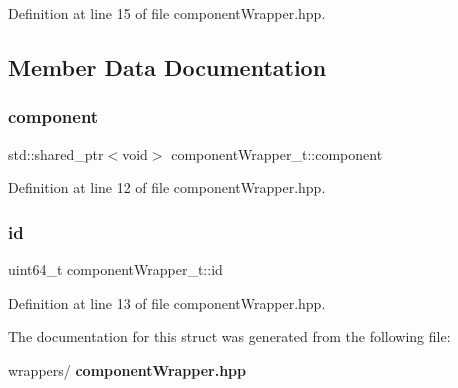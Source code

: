 Definition at line 15 of file component\+Wrapper.\+hpp.



\subsection{Member Data Documentation}
\mbox{\label{structcomponent_wrapper__t_a2ba0f6c96cc8e26401df3fecb346bf3f}} 
\subsubsection{component}
{\footnotesize\ttfamily std\+::shared\+\_\+ptr$<$void$>$ component\+Wrapper\+\_\+t\+::component}



Definition at line 12 of file component\+Wrapper.\+hpp.

\mbox{\label{structcomponent_wrapper__t_ac910faeaba296c9b3005d7a57dfedbc4}} 
\subsubsection{id}
{\footnotesize\ttfamily uint64\+\_\+t component\+Wrapper\+\_\+t\+::id}



Definition at line 13 of file component\+Wrapper.\+hpp.



The documentation for this struct was generated from the following file\+:\begin{DoxyCompactItemize}
\item 
wrappers/\textbf{ component\+Wrapper.\+hpp}\end{DoxyCompactItemize}
